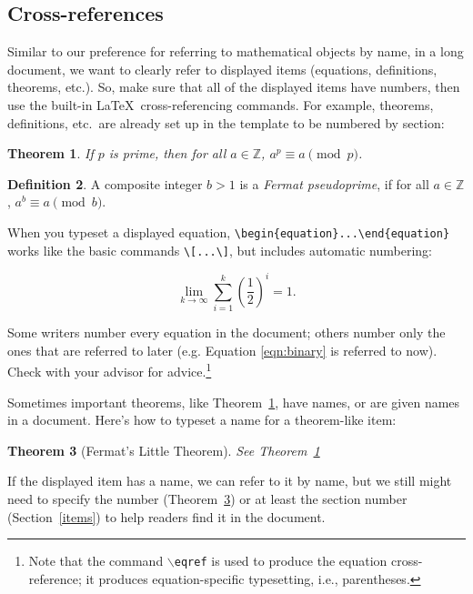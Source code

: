 \documentclass[11pt]{amsart}
\newtheorem{thm}{Theorem}[section] %
\theoremstyle{definition}                  %
\newtheorem{defn}[thm]{Definition}
\theoremstyle{remark}                       %
\numberwithin{equation}{section}
\newcommand{\Z}{\mathbb{Z}}
\begin{document}
\subsection{Cross-references}
Similar to our preference for referring to mathematical objects by name, in a long document, we want to clearly refer to displayed items (equations, definitions, theorems, etc.).  
So, make sure that all of the displayed items have numbers, then use the built-in  \LaTeX\ cross-referencing commands.
For example, theorems, definitions, etc.\ are already set up in the template to be numbered by section:

\begin{thm} \label{thm:fermat}
If $p$ is prime, then for all $a\in \Z$, $a^p \equiv a \pmod{p}$. %
\end{thm}

\begin{defn}
A composite integer $b>1$ is a \emph{Fermat pseudoprime}, if for all $a\in \Z$, $a^b \equiv a \pmod{b}$.
\end{defn}

When you typeset a displayed equation, \verb+\begin{equation}...\end{equation}+ works like the basic commands  \verb+\[...\]+, but includes automatic numbering:

\begin{equation} \label{eqn:binary}
 \lim_{k \rightarrow \infty} \sum_{i=1}^{k} \left( \frac{1}{2}\right)^i = 1.
\end{equation}

Some writers number every equation in the document; others number only the ones that are referred to later 
(e.g. Equation \eqref{eqn:binary} is referred to now).
Check with your advisor for advice.\footnote{Note that the command \texttt{$\backslash$eqref} is used to produce the equation cross-reference; it produces equation-specific typesetting, i.e., parentheses.}

Sometimes important theorems, like Theorem~\ref{thm:fermat}, have names, or are given names in a document. Here's how to typeset a name for a theorem-like item:

\begin{thm}[Fermat's Little Theorem]\label{thm:flt}
See Theorem~\ref{thm:fermat}
\end{thm}

If the displayed item has a name, we can refer to it by name, but we still might need to specify the number (Theorem~\ref{thm:flt})  or at least the section number (Section~\ref{items}) to help readers find it in the document.
\end{document}

